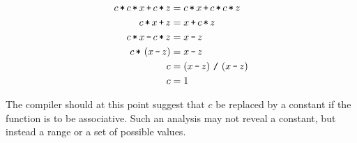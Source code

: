 \begin{align*}
c \lt c \lt x \lp c \lt z &= c \lt x \lp c \lt c \lt z \\
c \lt x \lp z &= x \lp c \lt z \\
c \lt x \lm c \lt z &= x \lm z \\
c \lt \p{x \lm z} &= x \lm z \\
c &= \p{x \lm z} \ld  \p{x \lm z} \\
c &= 1
\end{align*}

The compiler should at this point suggest that $c$ be replaced by a constant if
the function is to be associative. Such an analysis may not reveal a constant,
but instead a range or a set of possible values.

